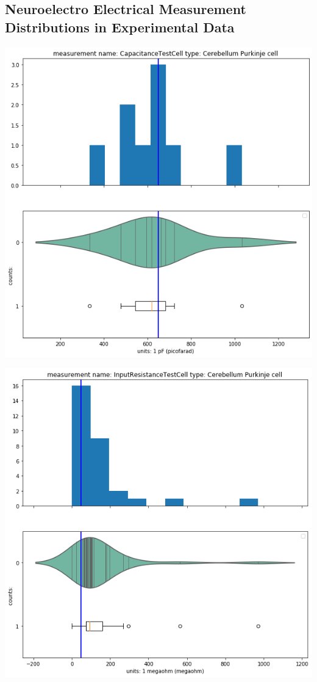 \subsection{Neuroelectro Electrical Measurement Distributions in Experimental Data}

    


    \begin{center}
    \includegraphics[width=0.7\linewidth]{notebooks_converted/needata_thesis_files/needata_thesis_5_1}
    \end{center}
    
    \begin{center}
    \includegraphics[width=0.7\linewidth]{notebooks_converted/needata_thesis_files/needata_thesis_5_2}
    \end{center}

